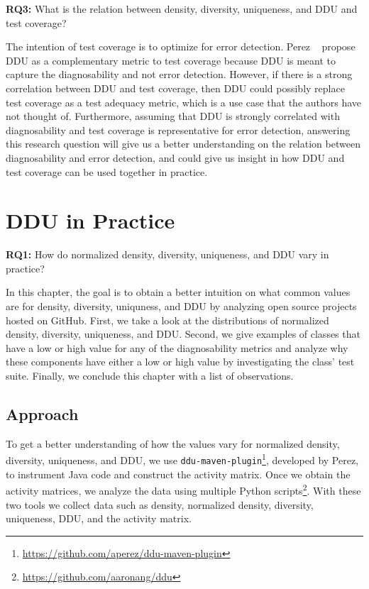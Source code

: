 \documentclass[twoside,a4paper,11pt]{memoir}
\begin{document}
\begin{framed}
\noindent
\textbf{RQ3:} What is the relation between density, diversity, uniqueness, and DDU and test coverage?
\end{framed}
The intention of test coverage is to optimize for error detection.
Perez \etal~\cite{DBLP:conf/icse/PerezAD17} propose DDU as a complementary metric to test coverage because DDU is meant to capture the diagnosability and not error detection.
However, if there is a strong correlation between DDU and test coverage, then DDU could possibly replace test coverage as a test adequacy metric, which is a use case that the authors have not thought of.
Furthermore, assuming that DDU is strongly correlated with diagnosability and test coverage is representative for error detection, answering this research question will give us a better understanding on the relation between diagnosability and error detection, and could give us insight in how DDU and test coverage can be used together in practice.

\chapter{DDU in Practice}%
\label{ch:rq1}
\begin{framed}
\noindent
\textbf{RQ1:} How do normalized density, diversity, uniqueness, and DDU vary in practice?
\end{framed}
In this chapter, the goal is to obtain a better intuition on what common values are for density, diversity, uniquness, and DDU by analyzing open source projects hosted on GitHub.
First, we take a look at the distributions of normalized density, diversity, uniqueness, and DDU\@.
Second, we give examples of classes that have a low or high value for any of the diagnosability metrics and analyze why these components have either a low or high value by investigating the class' test suite.
Finally, we conclude this chapter with a list of observations.

\section{Approach}
To get a better understanding of how the values vary for normalized density, diversity, uniqueness, and DDU, we use \texttt{ddu-maven-plugin}\footnote{\url{https://github.com/aperez/ddu-maven-plugin}}, developed by Perez, to instrument Java code and construct the activity matrix.
Once we obtain the activity matrices, we analyze the data using multiple Python scripts\footnote{\url{https://github.com/aaronang/ddu}}.
With these two tools we collect data such as density, normalized density, diversity, uniqueness, DDU, and the activity matrix.
\end{document}
